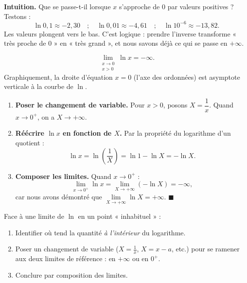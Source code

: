\documentclass[11pt]{article}
\newcommand{\cle}[1]{{\popxbold\color{popdark}#1}}
\newcounter{popsec}
\newcounter{popsub}
\newcommand{\courssub}[1]{%
  \stepcounter{popsub}%
  \par\vspace{9pt}\noindent{\popxbold\fontsize{11.5}{13}\selectfont\color{popink}{\color{poporange}\thepopsec.\thepopsub}\hspace{6pt}#1}\par\nopagebreak\vspace{4pt}
}
\begin{document}
\courssub{Limite de $\ln x$ en $0^+$}

\textbf{Intuition.} Que se passe-t-il lorsque $x$ s'approche de $0$ par valeurs positives ? Testons :
\[
\ln 0{,}1 \approx -2{,}30 \quad ; \quad \ln 0{,}01 \approx -4{,}61 \quad ; \quad \ln 10^{-6} \approx -13{,}82.
\]
Les valeurs plongent vers le bas. C'est logique : prendre l'inverse transforme « très proche de $0$ » en « très grand », et nous savons déjà ce qui se passe en $+\infty$.

\begin{propriete}
\[
\lim_{\substack{x \to 0 \\ x > 0}} \ln x = -\infty.
\]
Graphiquement, la droite d'équation $x = 0$ (l'axe des ordonnées) est \cle{asymptote verticale} à la courbe de $\ln$.
\end{propriete}

\begin{experience}[Démonstration guidée : le changement de variable $X = \dfrac{1}{x}$]
\begin{enumerate}
\item \textbf{Poser le changement de variable.} Pour $x > 0$, posons $X = \dfrac{1}{x}$. Quand $x \to 0^+$, on a $X \to +\infty$.
\item \textbf{Réécrire $\ln x$ en fonction de $X$.} Par la propriété du logarithme d'un quotient :
\[
\ln x = \ln\left(\frac{1}{X}\right) = \ln 1 - \ln X = -\ln X.
\]
\item \textbf{Composer les limites.} Quand $x \to 0^+$ :
\[
\lim_{x \to 0^+} \ln x = \lim_{X \to +\infty} (-\ln X) = -\infty,
\]
car nous avons démontré que $\lim\limits_{X \to +\infty} \ln X = +\infty$. $\blacksquare$
\end{enumerate}
\end{experience}

\begin{methode}
Face à une limite de $\ln$ en un point « inhabituel » :
\begin{enumerate}
\item Identifier où tend la quantité \emph{à l'intérieur} du logarithme.
\item Poser un changement de variable ($X = \frac{1}{x}$, $X = x - a$, etc.) pour se ramener aux deux limites de référence : en $+\infty$ ou en $0^+$.
\item Conclure par composition des limites.
\end{enumerate}
\end{methode}
\end{document}
